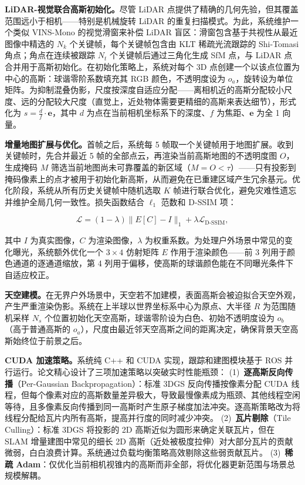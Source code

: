 \textbf{LiDAR-视觉联合高斯初始化。}尽管 LiDAR 点提供了精确的几何先验，但其覆盖范围远小于相机——特别是机械旋转 LiDAR 的重复扫描模式。为此，系统维护一个类似 VINS-Mono 的视觉滑窗来补偿 LiDAR 盲区：滑窗包含基于共视性从最近图像中精选的 $N_k$ 个关键帧，每个关键帧包含由 KLT 稀疏光流跟踪的 Shi-Tomasi 角点；角点在连续被跟踪 $N_t$ 个关键帧后通过三角化生成 SfM 点，与 LiDAR 点合并用于高斯初始化。在初始化策略上，系统对每个 3D 点创建一个以该点位置为中心的高斯：球谐零阶系数填充其 RGB 颜色，不透明度设为 $o_a$，旋转设为单位矩阵。为抑制混叠伪影，尺度按深度自适应分配——离相机近的高斯分配较小尺度、远的分配较大尺度（直觉上，近处物体需要更精细的高斯来表达细节），形式化为 $s = \frac{d}{f} \cdot \mathbf{e}$，其中 $d$ 为点在当前相机坐标系下的深度、$f$ 为焦距、$\mathbf{e}$ 为全 1 向量。

\textbf{增量地图扩展与优化。}首帧之后，系统每 5 帧取一个关键帧用于地图扩展。收到关键帧时，先合并最近 5 帧的全部点云，再渲染当前高斯地图的不透明度图 $O$，生成掩码 $M$ 筛选当前地图尚未可靠覆盖的新区域（$M = O < \tau$）——只有投影到掩码像素上的点才被用于初始化新高斯，从而避免在已重建区域产生冗余基元。优化阶段，系统从所有历史关键帧中随机选取 $K$ 帧进行联合优化，避免灾难性遗忘并维护全局几何一致性。损失函数结合 $\ell_1$ 范数和 D-SSIM 项：

\begin{equation}
\mathcal{L} = (1-\lambda)\|E[C] - I\|_1 + \lambda \mathcal{L}_{\text{D-SSIM}},
\end{equation}

其中 $I$ 为真实图像，$C$ 为渲染图像，$\lambda$ 为权重系数。为处理户外场景中常见的变化曝光，系统额外优化一个 $3 \times 4$ 仿射矩阵 $E$ 作用于渲染颜色——前 3 列用于颜色通道的逐通道缩放，第 4 列用于偏移，使高斯的球谐颜色能在不同曝光条件下自适应校正。

\textbf{天空建模。}在无界户外场景中，天空若不加建模，表面高斯会被迫拟合天空外观，产生严重渲染伪影。系统在上半球以世界坐标系中心为原点、大半径 $R$ 为范围随机采样 $N_s$ 个位置初始化天空高斯，球谐零阶设为白色、初始不透明度设为 $o_b$（高于普通高斯的 $o_a$），尺度由最近邻天空高斯之间的距离决定，确保背景天空高斯始终位于前景之后。

\textbf{CUDA 加速策略。}系统纯 C++ 和 CUDA 实现，跟踪和建图模块基于 ROS 并行运行。论文精心设计了三项加速策略以突破实时性能瓶颈：
(1)~\textbf{逐高斯反向传播}（Per-Gaussian Backpropagation）：标准 3DGS 反向传播按像素分配 CUDA 线程，但每个像素对应的高斯数量差异极大，导致最慢像素成为瓶颈、其他线程空闲等待，且多像素反向传播到同一高斯时产生原子梯度加法冲突。逐高斯策略改为将线程分配给瓦片内所有高斯，提高并行度的同时减少冲突。
(2)~\textbf{瓦片剔除}（Tile Culling）：标准 3DGS 将投影的 2D 高斯近似为圆形来确定关联瓦片，但在 SLAM 增量建图中常见的细长 2D 高斯（近处被极度拉伸）对大部分瓦片的贡献微弱，白白浪费计算。系统通过负载均衡策略高效剔除这些弱贡献瓦片。
(3)~\textbf{稀疏 Adam}：仅优化当前相机视锥内的高斯而非全部，将优化器更新范围与场景总规模解耦。

